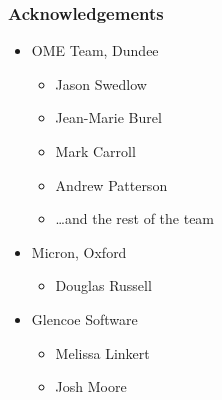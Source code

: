 \documentclass[handout]{beamer}
\begin{document}
\begin{frame}[plain]
  \frametitle{Acknowledgements}
  \parbox[t]{0.45\textwidth}{
    \begin{itemize}
    \item OME Team, Dundee
      \begin{itemize}
      \item Jason Swedlow
      \item Jean-Marie Burel
      \item Mark Carroll
      \item Andrew Patterson
      \item …and the rest of the team
      \end{itemize}
    \end{itemize}
  }
  \parbox[t]{0.45\textwidth}{
    \begin{itemize}
    \item Micron, Oxford
      \begin{itemize}
      \item Douglas Russell
      \end{itemize}
    \item Glencoe Software
      \begin{itemize}
      \item Melissa Linkert
      \item Josh Moore
      \end{itemize}
    \end{itemize}
  }

  \bigskip
  \bigskip
  \bigskip
  \bigskip
  \begin{center}
     \hfill
    \hfill
  \end{center}
\end{frame}
\end{document}

